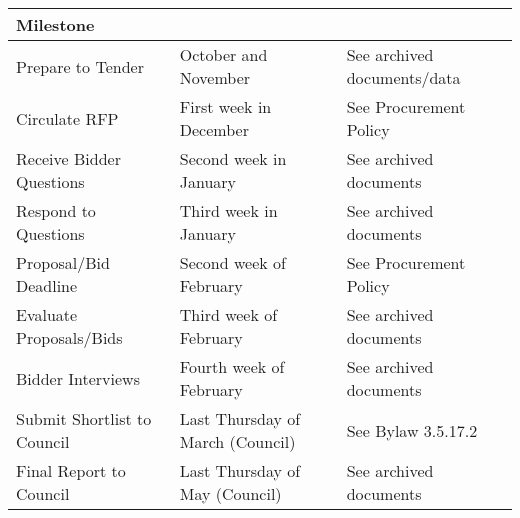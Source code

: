 \begin{longenum}[ label*=\thesubsection.\arabic*., align=left]
\begin{longenum}[label*=\arabic*., align=left]
\begin{tabular}{|l|l|l|}
\hline 
\multicolumn{3}{|l|}{\textbf{Milestone}} \\ 
\hline 
Prepare to Tender & October and November & See archived documents/data \\ 
\hline 
Circulate RFP & First week in December & See Procurement Policy \\ 
\hline 
Receive Bidder Questions & Second week in January & See archived documents \\ 
\hline 
Respond to Questions & Third week in January & See archived documents \\ 
\hline 
Proposal/Bid Deadline & Second week of February & See Procurement Policy \\ 
\hline 
Evaluate Proposals/Bids & Third week of February & See archived documents \\ 
\hline 
Bidder Interviews & Fourth week of February & See archived documents \\ 
\hline 
Submit Shortlist to Council & Last Thursday of  March (Council) & See Bylaw 3.5.17.2 \\ 
\hline 
Final Report to Council & Last Thursday of \newline May (Council) & See archived documents \\ 
\hline 
\end{tabular}


\end{longenum}
\end{longenum}
